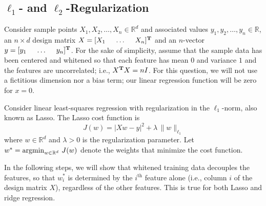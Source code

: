 \newpage


\subsection{$\ell_1$- and $\ell_2$-Regularization}


Consider sample points $X_1, X_2, \ldots, X_n \in \mathbb{R}^d$ and
associated values $y_1, y_2, \ldots, y_n \in \mathbb{R}$,
an $n \times d$ design matrix $X = [X_1~~~~\dots~~~~X_n]^{\mathbf{T}}$ and
an $n$-vector $y = [y_1~~~~\dots~~~~y_n]^{\mathbf{T}}$.
For the sake of simplicity, assume that the sample data
has been centered and whitened so that
each feature has mean $0$ and variance $1$ and the features are uncorrelated;
i.e., $X^{\mathbf{T}} X = nI$.
For this question, we will not use a fictitious dimension nor a bias term;
our linear regression function will be zero for $x = 0$.

Consider linear least-squares regression with
regularization in the $\ell_1$-norm, also known as Lasso.
The Lasso cost function is
\[
J(w) = |Xw - y|^2 +\lambda \, \|w\|_{\ell_1}
\]
where $w \in \mathbb{R}^d$ and $\lambda > 0$ is the regularization parameter.
Let $w^* = \operatorname*{argmin}_{w \in \mathbb{R}^d} \, J(w)$ denote
the weights that minimize the cost function.

In the following steps, we will show that whitened training data decouples the features, so that $w^*_i$ is determined by the $i^\mathrm{th}$ feature alone (i.e., column $i$ of the design matrix $X$), regardless of the other features.  This is true for both Lasso and ridge regression.

